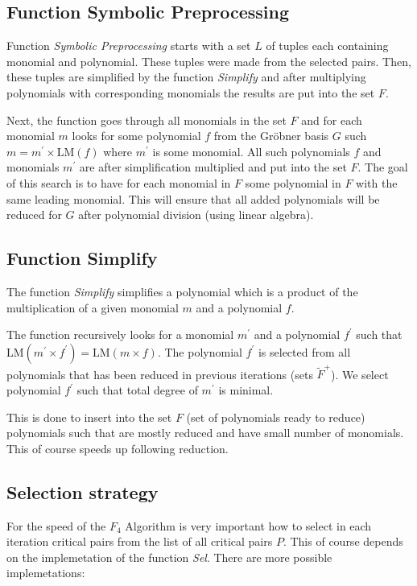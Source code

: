 

\subsection{Function Symbolic Preprocessing}
Function \textit{Symbolic Preprocessing} starts with a set $L$ of tuples each containing monomial and polynomial. These tuples were made from the selected pairs. Then, these tuples are simplified by the function \textit{Simplify} and after multiplying polynomials with corresponding monomials the results are put into the set $F$.

Next, the function goes through all monomials in the set $F$ and for each monomial $m$ looks for some polynomial $f$ from the Gr\"obner basis $G$ such $m = m^\prime \times \textrm{LM}(f)$ where $m^\prime$ is some monomial. All such polynomials $f$ and monomials $m^\prime$ are after simplification multiplied and put into the set $F$. The goal of this search is to have for each monomial in $F$ some polynomial in $F$ with the same leading monomial. This will ensure that all added polynomials will be reduced for $G$ after polynomial division (using linear algebra).



\subsection{Function Simplify}
The function \textit{Simplify} simplifies a polynomial which is a product of the multiplication of a given monomial $m$ and a polynomial $f$.

The function recursively looks for a monomial $m^\prime$ and a polynomial $f^\prime$ such that $\textrm{LM}(m^\prime\times f^\prime) = \textrm{LM}(m\times f)$. The polynomial $f^\prime$ is selected from all polynomials that has been reduced in previous iterations (sets $\tilde{F}^+$). We select polynomial $f^\prime$ such that total degree of $m^\prime$ is minimal.

This is done to insert into the set $F$ (set of polynomials ready to reduce) polynomials such that are mostly reduced and have small number of monomials. This of course speeds up following reduction.



\subsection{Selection strategy}
\label{subsec:F4:sel}
For the speed of the $F_4$ Algorithm is very important how to select in each iteration critical pairs from the list of all critical pairs $P$. This of course depends on the implemetation of the function \textit{Sel}. There are more possible implemetations:

